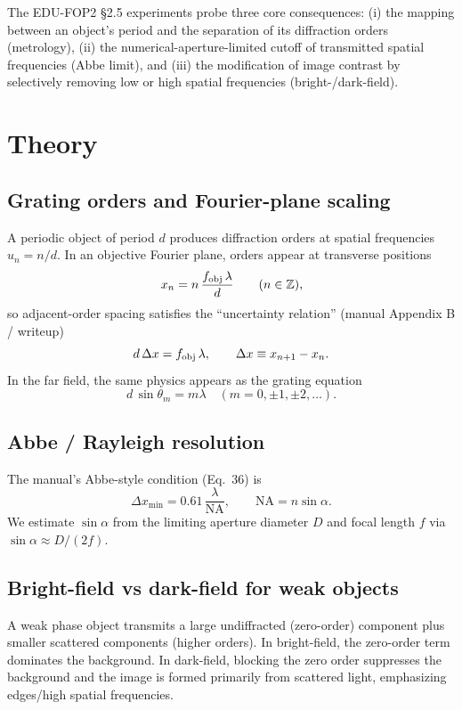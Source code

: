 \documentclass[10pt,twocolumn]{article}
\begin{document}
The EDU-FOP2 \S2.5 experiments probe three core consequences: (i) the mapping between an object's period and the separation of its diffraction orders (metrology), (ii) the numerical-aperture-limited cutoff of transmitted spatial frequencies (Abbe limit), and (iii) the modification of image contrast by selectively removing low or high spatial frequencies (bright-/dark-field).

\section{Theory}
\subsection{Grating orders and Fourier-plane scaling}
A periodic object of period $d$ produces diffraction orders at spatial frequencies $u_n=n/d$. In an objective Fourier plane, orders appear at transverse positions
\begin{equation}
 x_n = n\,\frac{f_{\rm obj}\,\lambda}{d}\qquad(n\in\mathbb{Z}),
 \label{eq:xn}
\end{equation}
so adjacent-order spacing satisfies the ``uncertainty relation'' (manual Appendix B / writeup)
\begin{equation}
 d\,\Delta x = f_{\rm obj}\,\lambda,\qquad \Delta x\equiv x_{n+1}-x_n.
 \label{eq:uncertainty}
\end{equation}
In the far field, the same physics appears as the grating equation
\begin{equation}
 d\,\sin\theta_m=m\lambda\quad(m=0,\pm1,\pm2,\dots).
 \label{eq:grating}
\end{equation}

\subsection{Abbe / Rayleigh resolution}
The manual's Abbe-style condition (Eq.~36) is
\begin{equation}
\Delta x_{\min}=0.61\,\frac{\lambda}{\mathrm{NA}},\qquad \mathrm{NA}=n\sin\alpha.
\label{eq:abbe}
\end{equation}
We estimate $\sin\alpha$ from the limiting aperture diameter $D$ and focal length $f$ via $\sin\alpha\approx D/(2f)$.

\subsection{Bright-field vs dark-field for weak objects}
A weak phase object transmits a large undiffracted (zero-order) component plus smaller scattered components (higher orders). In bright-field, the zero-order term dominates the background. In dark-field, blocking the zero order suppresses the background and the image is formed primarily from scattered light, emphasizing edges/high spatial frequencies.
\end{document}
